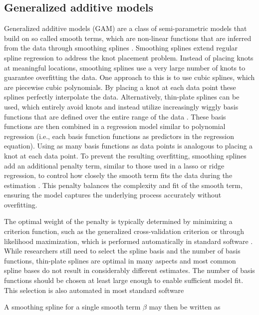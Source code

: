 \documentclass[man, floatsintext]{apa7}
\begin{document}
\subsection{Generalized additive models}

Generalized additive models (GAM) are a class of semi-parametric models that
build on so called smooth terms, which are non-linear functions that are
inferred from the data through smoothing splines
\parencite{wood_generalized_2006, wood_inference_2020,
  hastie_generalized_1999}. Smoothing splines extend regular spline regression
to
address the knot placement problem. Instead of placing knots at meaningful
locations, smoothing splines use a very large number of knots to guarantee
overfitting the data. One approach to this is to use cubic splines, which are
piecewise cubic polynomials. By placing a knot at each data point these splines
perfectly interpolate the data. Alternatively, thin-plate splines can be used,
which entirely avoid knots and instead utilize increasingly wiggly basis
functions that are defined over the entire range of the data
\parencite{wood_thin_2003}. These basis functions are then combined in a
regression model similar to polynomial regression (i.e., each basis function
functions as predictors in the regression equation). Using as many basis
functions as data points is analogous to placing a knot at each data point. To
prevent the resulting overfitting, smoothing splines add an additional penalty
term, similar to those used in a lasso or ridge regression, to control how
closely the smooth term fits the data during the estimation
\parencite{gu_smoothing_2013, wahba_spline_1980}. This penalty balances the
complexity and fit of the smooth term, ensuring the model captures the
underlying process accurately without overfitting.

The optimal weight of the
penalty is typically determined by minimizing a criterion function, such as the
generalized cross-validation criterion or through likelihood maximization,
which is performed automatically in standard software
\parencite{wood_generalized_2006, golub_generalized_1997}. While researchers
still need to select the spline basis and the number of basis functions,
thin-plate splines are optimal in many aspects and most common spline bases do
not result in considerably different estimates. The number of basis functions
should be chosen at least large enough to enable sufficient model fit. This
selection is also automated in most standard software \parencite{R-mgcv_a}

A smoothing spline for a single smooth term $\beta$ may then be written as
\end{document}
